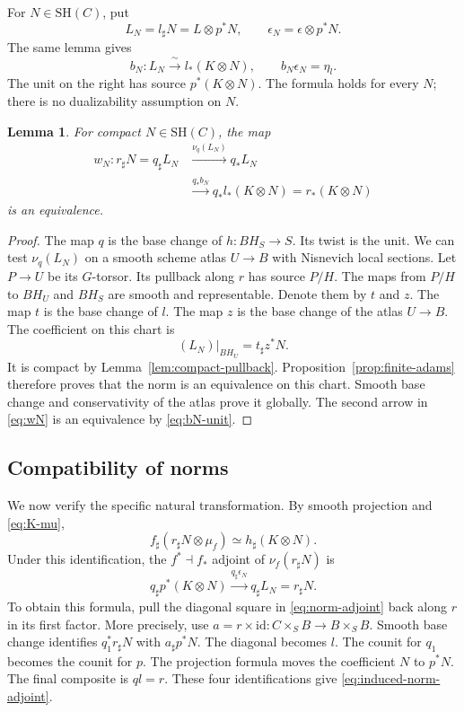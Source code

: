 \documentclass[11pt,reqno]{amsart}
\newtheorem{lemma}[theorem]{Lemma}
\theoremstyle{definition}
\theoremstyle{remark}
\theoremstyle{plain}
\numberwithin{equation}{section}
\newcommand{\SH}{\mathrm{SH}}
\begin{document}
For \(N\in\SH(C)\), put
\[
 L_N=l_\sharp N=L\otimes p^*N,\qquad
 \epsilon_N=\epsilon\otimes p^*N.
\]
The same lemma gives
\begin{equation}\label{eq:bN-unit}
 b_N:L_N\xrightarrow{\ \sim\ }l_*(K\otimes N),
 \qquad b_N\epsilon_N=\eta_l.
\end{equation}
The unit on the right has source \(p^*(K\otimes N)\).
The formula holds for every \(N\); there is no dualizability assumption on \(N\).

\begin{lemma}\label{lem:graph-finite-norm}
For compact \(N\in\SH(C)\), the map
\begin{equation}\label{eq:wN}
\begin{split}
 w_N:r_\sharp N=q_\sharp L_N
 &\xrightarrow{\nu_q(L_N)}q_*L_N\\
 &\xrightarrow{q_*b_N}q_*l_*(K\otimes N)
 =r_*(K\otimes N)
\end{split}
\end{equation}
is an equivalence.
\end{lemma}
\begin{proof}
The map \(q\) is the base change of \(h:BH_S\to S\).
Its twist is the unit.
We can test \(\nu_q(L_N)\) on a smooth scheme atlas \(U\to B\) with Nisnevich local sections.
Let \(P\to U\) be its \(G\)-torsor.
Its pullback along \(r\) has source \(P/H\).
The maps from \(P/H\) to \(BH_U\) and \(BH_S\) are smooth and representable. Denote them by \(t\) and \(z\).
The map \(t\) is the base change of \(l\).
The map \(z\) is the base change of the atlas \(U\to B\).
The coefficient on this chart is
\[
 (L_N)|_{BH_U}=t_\sharp z^*N.
\]
It is compact by Lemma~\ref{lem:compact-pullback}.
Proposition~\ref{prop:finite-adams} therefore proves that the norm is an equivalence on this chart.
Smooth base change and conservativity of the atlas prove it globally.
The second arrow in \eqref{eq:wN} is an equivalence by \eqref{eq:bN-unit}.
\end{proof}

\subsection{Compatibility of norms}
We now verify the specific natural transformation.
By smooth projection and \eqref{eq:K-mu},
\[
 f_\sharp(r_\sharp N\otimes\mu_f)
 \simeq h_\sharp(K\otimes N).
\]
Under this identification, the \(f^*\dashv f_*\) adjoint of \(\nu_f(r_\sharp N)\) is
\begin{equation}\label{eq:induced-norm-adjoint}
 q_\sharp p^*(K\otimes N)
 \xrightarrow{q_\sharp\epsilon_N}
 q_\sharp L_N=r_\sharp N.
\end{equation}
To obtain this formula, pull the diagonal square in \eqref{eq:norm-adjoint} back along \(r\) in its first factor.
More precisely, use \(a=r\times\mathrm{id}:C\times_S B\to B\times_S B\).
Smooth base change identifies \(q_1^*r_\sharp N\) with \(a_\sharp p^*N\).
The diagonal becomes \(l\).
The counit for \(q_1\) becomes the counit for \(p\).
The projection formula moves the coefficient \(N\) to \(p^*N\).
The final composite is \(ql=r\).
These four identifications give \eqref{eq:induced-norm-adjoint}.
\end{document}
